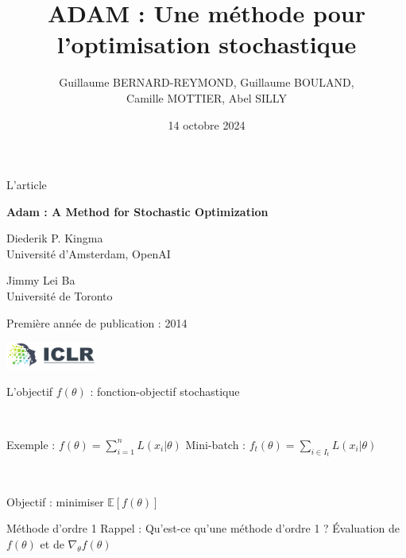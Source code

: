 \documentclass[11pt,aspectratio=169,xcolor=dvipsnames, french]{beamer}
\title{ADAM : Une méthode pour l'optimisation stochastique}
\author{Guillaume BERNARD-REYMOND, Guillaume BOULAND,\\ Camille MOTTIER, Abel SILLY}
\date{14 octobre 2024}
\begin{document}
\frame{\titlepage}

\begin{frame}{L'article}
\begin{center}
 \textbf{Adam : A Method for Stochastic Optimization}

\begin{multicols}{2}

 Diederik P. Kingma\\
 {\small Université d'Amsterdam, OpenAI}
 
 \columnbreak
 
 Jimmy Lei Ba\\
 {\small Université de Toronto}
\end{multicols}

Première année de publication : 2014

\includegraphics[width=3cm]{ICLR_Logo.png}
\end{center}

\end{frame}

\begin{frame}{L'objectif}
$f(\theta)$ : fonction-objectif stochastique 

\

Exemple : $f(\theta)=\displaystyle\sum_{i=1}^{n}L(x_i|\theta)$ \hspace{2cm}
Mini-batch : $f_t(\theta)=\displaystyle \sum_{i\in I_t}L(x_i|\theta)$

\

Objectif : minimiser $\mathbb E[f(\theta)]$
\end{frame}

\begin{frame}{Méthode d'ordre 1}
Rappel : Qu'est-ce qu'une méthode d'ordre 1 ? Évaluation de $f(\theta)$ et de $\nabla_{\theta}f(\theta)$

\begin{center}

\end{center}

\end{frame}
\end{document}
